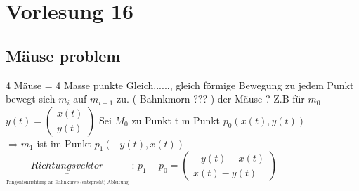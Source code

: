 \section{Vorlesung 16}
\subsection{Mäuse problem}
4 Mäuse = 4 Masse punkte 
Gleich......, gleich förmige Bewegung zu jedem Punkt bewegt sich $m_i$ auf $m_{i+1}$ zu.
( Bahnkmorn ??? ) der Mäuse ? Z.B für $m_0$\\
$y(t)= \begin{pmatrix}
x(t)\\
y(t)
\end{pmatrix}$
Sei $M_0$ zu Punkt t m Punkt $p_0(x(t),y(t))$\\
 $\Rightarrow m_1$ ist im Punkt $p_1 (-y(t),x(t))$\\
$\underset{\underset{\text{Tangentenrichtung an Bahnkurve (entspricht) Ableitung} }{\uparrow}}{Richtungsvektor}$  : $p_1 - p_0 = \begin{pmatrix}
 									-y(t) - x(t)\\
									 x(t)-y(t)
								\end{pmatrix}$\\
								
